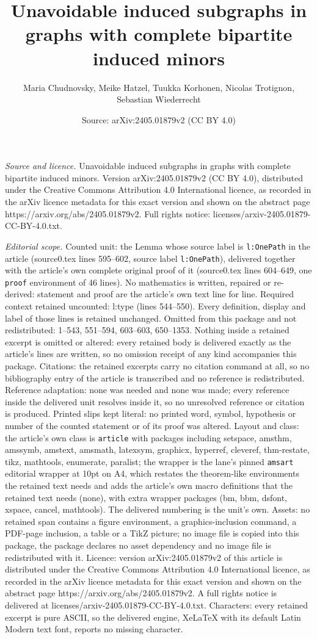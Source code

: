 \documentclass[10pt,a4paper]{amsart}
\title[Unavoidable induced subgraphs in graphs with complete bipart]{Unavoidable induced subgraphs in graphs with complete bipartite induced minors}
\author{Maria Chudnovsky, Meike Hatzel, Tuukka Korhonen, Nicolas Trotignon, Sebastian Wiederrecht}
\date{Source: arXiv:2405.01879v2 (CC BY 4.0)}
\begin{document}
\maketitle

\noindent\emph{Source and licence.} Unavoidable induced subgraphs in graphs with complete bipartite induced minors. Version arXiv:2405.01879v2 (CC BY 4.0), distributed under the Creative Commons Attribution 4.0 International licence, as recorded in the arXiv licence metadata for this exact version and shown on the abstract page https://arxiv.org/abs/2405.01879v2. Full rights notice: licenses/arxiv-2405.01879-CC-BY-4.0.txt.\par\smallskip

\noindent\textit{Editorial scope.} Counted unit: the Lemma whose source label is \texttt{l:OnePath} in the article (source0.tex lines 595--602, source label \texttt{l:OnePath}), delivered together with the article's own complete original proof of it (source0.tex lines 604--649, one \texttt{proof} environment of 46 lines). No mathematics is written, repaired or re-derived: statement and proof are the article's own text line for line. Required context retained uncounted: l:type (lines 544--550). Every definition, display and label of those lines is retained unchanged. Omitted from this package and not redistributed: 1--543, 551--594, 603--603, 650--1353. Nothing inside a retained excerpt is omitted or altered: every retained body is delivered exactly as the article's lines are written, so no omission receipt of any kind accompanies this package. Citations: the retained excerpts carry no citation command at all, so no bibliography entry of the article is transcribed and no reference is redistributed. Reference adaptation: none was needed and none was made; every reference inside the delivered unit resolves inside it, so no unresolved reference or citation is produced. Printed slips kept literal: no printed word, symbol, hypothesis or number of the counted statement or of its proof was altered. Layout and class: the article's own class is \texttt{article} with packages including setspace, amsthm, amssymb, amstext, amsmath, latexsym, graphicx, hyperref, cleveref, thm-restate, tikz, mathtools, enumerate, paralist; the wrapper is the lane's pinned \texttt{amsart} editorial wrapper at 10pt on A4, which restates the theorem-like environments the retained text needs and adds the article's own macro definitions that the retained text needs (none), with extra wrapper packages (bm, bbm, dsfont, xspace, cancel, mathtools). The delivered numbering is the unit's own. Assets: no retained span contains a figure environment, a graphics-inclusion command, a PDF-page inclusion, a table or a TikZ picture; no image file is copied into this package, the package declares no asset dependency and no image file is redistributed with it. Licence: version arXiv:2405.01879v2 of this article is distributed under the Creative Commons Attribution 4.0 International licence, as recorded in the arXiv licence metadata for this exact version and shown on the abstract page https://arxiv.org/abs/2405.01879v2. A full rights notice is delivered at licenses/arxiv-2405.01879-CC-BY-4.0.txt. Characters: every retained excerpt is pure ASCII, so the delivered engine, XeLaTeX with its default Latin Modern text font, reports no missing character.
\end{document}
